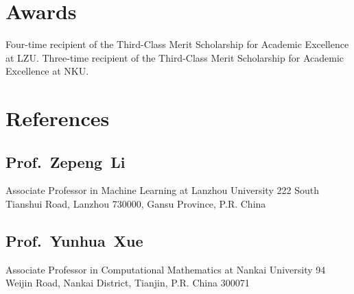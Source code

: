 \documentclass[11pt,a4paper, final]{moderncv}
\newcommand{\spacesubsection}{\vspace{0.2cm}}
\begin{document}
\section{\textbf{Awards}}
		{Four-time recipient of the Third-Class Merit Scholarship for Academic Excellence at LZU.}
		{Three-time recipient of the Third-Class Merit Scholarship for Academic Excellence at NKU.}
\section{\textbf{References}}
	\subsection{\textbf{Prof.~Zepeng~Li}}
		\cvline{}
		{Associate Professor in Machine Learning at Lanzhou University}
		{222 South Tianshui Road, Lanzhou 730000, Gansu Province, P.R. China}
	\subsection{\textbf{Prof.~Yunhua~Xue}}
		\cvline{}
		{Associate Professor in Computational Mathematics at Nankai University}
		{94 Weijin Road, Nankai District, Tianjin, P.R. China 300071}
\end{document}
